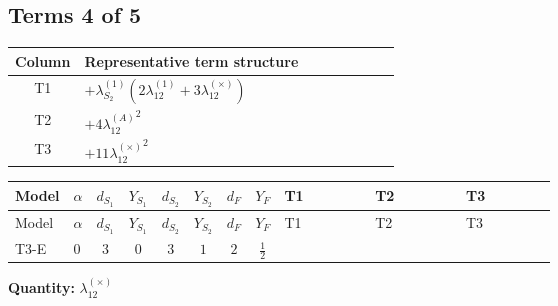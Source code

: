 \documentclass[8pt]{article}
\begin{document}
\begin{landscape}
\subsection*{Terms 4 of 5}
\begin{center}
\begin{tabular}{@{}c >{\raggedright\arraybackslash}p{0.82\linewidth}@{}}
\toprule
Column & Representative term structure \\
\midrule
T1 & \(\displaystyle +{\lambda_{S_2}^{(1)}} (2 {\lambda_{12}^{(1)}}+3 {\lambda_{12}^{(\times)}})\) \\
\midrule
T2 & \(\displaystyle +4 {\lambda_{12}^{(A)}}^2\) \\
\midrule
T3 & \(\displaystyle +11 {\lambda_{12}^{(\times)}}^2\) \\
\midrule
\bottomrule
\end{tabular}
\end{center}
\smallskip
\tiny
\begin{longtable}{@{}llcccccc >{\raggedright\arraybackslash}p{0.21\linewidth} >{\raggedright\arraybackslash}p{0.21\linewidth} >{\raggedright\arraybackslash}p{0.21\linewidth}@{}}
\toprule
Model & $\alpha$ & $d_{S_1}$ & $Y_{S_1}$ & $d_{S_2}$ & $Y_{S_2}$ & $d_F$ & $Y_F$ & T1 & T2 & T3 \\
\midrule
\endfirsthead
\toprule
Model & $\alpha$ & $d_{S_1}$ & $Y_{S_1}$ & $d_{S_2}$ & $Y_{S_2}$ & $d_F$ & $Y_F$ & T1 & T2 & T3 \\
\midrule
\endhead
T3-E & $0$ & $3$ & $0$ & $3$ & $1$ & $2$ & $\frac{1}{2}$ & \scriptsize\adjustbox{max width=\linewidth}{$\begin{gathered} +{\lambda_{S_2}^{(1)}} (2 {\lambda_{12}^{(1)}}+3 {\lambda_{12}^{(\times)}})\end{gathered}$} & \scriptsize\adjustbox{max width=\linewidth}{$\begin{gathered} +4 {\lambda_{12}^{(A)}}^2\end{gathered}$} & \scriptsize\adjustbox{max width=\linewidth}{$\begin{gathered} +11 {\lambda_{12}^{(\times)}}^2\end{gathered}$} \\
\midrule
\bottomrule
\end{longtable}
\clearpage
\noindent\textbf{Quantity: }$\lambda_{12}^{(\times)}$\par\smallskip

\end{landscape}
\end{document}

